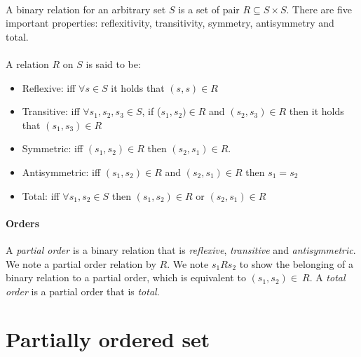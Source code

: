 \documentclass[letterpaper]{memoir}
\begin{document}
\paragraph{}

A binary relation for an arbitrary set $S$ is
a set of pair $R \subseteq S \times S$.
There are five important properties: reflexitivity, transitivity,
symmetry, antisymmetry and total.

\paragraph{}

A relation $R$ on $S$ is said to be:

\begin{itemize}
    \item Reflexive:
    iff $\forall s \in S$ it holds that $(s, s) \in R$
    \item Transitive:
    iff $\forall s_1, s_2, s_3 \in S$,
    if ($s_1, s_2) \in R$ and $(s_2, s_3) \in R$
    then it holds that $(s_1, s_3) \in R$
    \item Symmetric: iff $(s_1, s_2) \in R$ then $(s_2, s_1) \in R$.
    \item Antisymmetric: iff $(s_1, s_2) \in R$
    and $(s_2, s_1) \in R$ then $s_1 = s_2$
    \item Total: iff $\forall s_1, s_2 \in S$ then $(s_1, s_2) \in R$
    or $(s_2, s_1) \in R$

\end{itemize}

\paragraph{Orders}

A \textit{partial order} is a binary relation that is \textit{reflexive},
\textit{transitive} and \textit{antisymmetric}. We note a
partial order relation by $R$.
We note $s_1 R  s_2$ to show the belonging of
a binary relation to a partial order, which is equivalent
to $(s_1, s_2) \in \ R$.
A \textit{total order} is a partial order that is \textit{total}.

\section{Partially ordered set}

\paragraph{}
\end{document}
